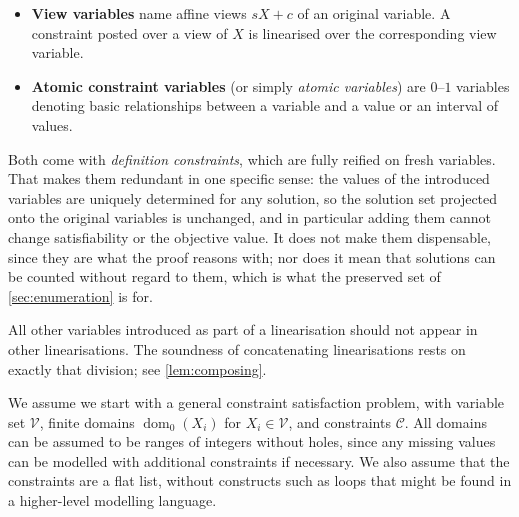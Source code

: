 \documentclass[11pt,a4paper]{article}
\theoremstyle{plain}
\theoremstyle{definition}
\theoremstyle{remark}
\newcommand{\fname}[1]{\ensuremath{\operatorname{#1}}}
\newcommand{\dm}{\fname{dom}}
\begin{document}
\begin{itemize}
  \item \textbf{View variables} name affine views $sX+c$ of an
    original variable.  A constraint posted over a view of $X$ is linearised
    over the corresponding view variable.
  \item \textbf{Atomic constraint variables} (or simply \emph{atomic
    variables}) are $0$--$1$ variables denoting basic relationships between a
    variable and a value or an interval of values.
\end{itemize}

Both come with \emph{definition constraints}, which are fully reified on fresh
variables.  That makes them redundant in one specific sense: the values of the
introduced variables are uniquely determined for any solution, so the solution
set projected onto the original variables is unchanged, and in particular
adding them cannot change satisfiability or the objective value.  It does not
make them dispensable, since they are what the proof reasons with; nor does it
mean that solutions can be counted without regard to them, which is what the
preserved set of \cref{sec:enumeration} is for.

All other variables introduced as part of a linearisation should not appear in
other linearisations.  The soundness of concatenating linearisations rests on
exactly that division; see \cref{lem:composing}.

We assume we start with a general constraint satisfaction problem, with
variable set $\mathcal V$, finite domains $\dm_0(X_i)$ for $X_i\in\mathcal V$,
and constraints $\mathcal C$.  All domains can be assumed to be ranges of
integers without holes, since any missing values can be modelled with
additional constraints if necessary.  We also assume that the constraints are a
flat list, without constructs such as loops that might be found in a
higher-level modelling language.
\end{document}
